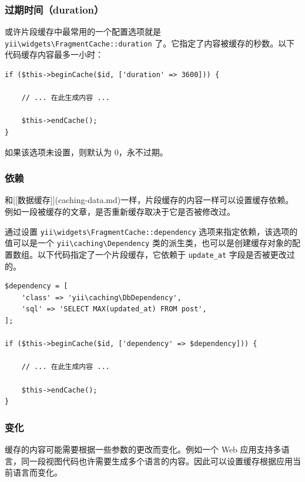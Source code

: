 \subsubsection{过期时间（duration） \label{caching-fragment.md::duration}}
或许片段缓存中最常用的一个配置选项就是 \texttt{yii{\allowbreak{}\textbackslash}widgets{\allowbreak{}\textbackslash}FragmentCache\allowbreak{}::\allowbreak{}duration} 了。它指定了内容被缓存的秒数。以下代码缓存内容最多一小时：

\lstset{language=php}\begin{lstlisting}
if ($this->beginCache($id, ['duration' => 3600])) {

    // ... 在此生成内容 ...

    $this->endCache();
}
\end{lstlisting}
如果该选项未设置，则默认为 0，永不过期。

\subsubsection{依赖 \label{caching-fragment.md::dependencies}}
和[[数据缓存]](caching-data.md)一样，片段缓存的内容一样可以设置缓存依赖。例如一段被缓存的文章，是否重新缓存取决于它是否被修改过。

通过设置 \texttt{yii{\allowbreak{}\textbackslash}widgets{\allowbreak{}\textbackslash}FragmentCache\allowbreak{}::\allowbreak{}dependency} 选项来指定依赖，该选项的值可以是一个 \texttt{yii{\allowbreak{}\textbackslash}caching{\allowbreak{}\textbackslash}Dependency} 类的派生类，也可以是创建缓存对象的配置数组。以下代码指定了一个片段缓存，它依赖于 \lstinline|update_at| 字段是否被更改过的。

\lstset{language=php}\begin{lstlisting}
$dependency = [
    'class' => 'yii\caching\DbDependency',
    'sql' => 'SELECT MAX(updated_at) FROM post',
];

if ($this->beginCache($id, ['dependency' => $dependency])) {

    // ... 在此生成内容 ...

    $this->endCache();
}
\end{lstlisting}
\subsubsection{变化 \label{caching-fragment.md::variations}}
缓存的内容可能需要根据一些参数的更改而变化。例如一个 Web 应用支持多语言，同一段视图代码也许需要生成多个语言的内容。因此可以设置缓存根据应用当前语言而变化。

